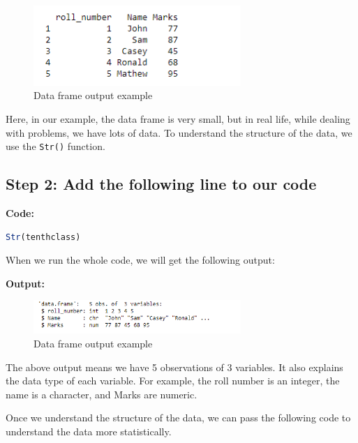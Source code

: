 \documentclass[10pt]{book}
\begin{document}
\begin{figure}[h]
    \begin{flushleft}
        \includegraphics[width=0.7\textwidth]{Data-Frames-in-R-1-1.png} %
        \caption{Data frame output example}
        \label{fig:dataframe}
    \end{flushleft}
\end{figure}
Here, in our example, the data frame is very small, but in real life, while dealing with problems, we have lots of data. To understand the structure of the data, we use the \texttt{Str()} function.

\subsection{Step 2: Add the following line to our code}

\textbf{Code:}
\begin{lstlisting}[language=R]
Str(tenthclass)
\end{lstlisting}

When we run the whole code, we will get the following output:

\textbf{Output:}
\begin{figure}[h]
    \begin{flushleft}
        \includegraphics[width=0.7\textwidth]{Data-Frames-in-R-1-2.png} %
        \caption{Data frame output example}
        \label{fig:dataframe}
    \end{flushleft}
\end{figure}

The above output means we have 5 observations of 3 variables. It also explains the data type of each variable. For example, the roll number is an integer, the name is a character, and Marks are numeric.

Once we understand the structure of the data, we can pass the following code to understand the data more statistically.
\end{document}
